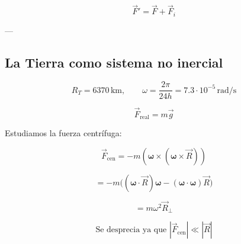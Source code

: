 \documentclass[a4paper,12pt]{article}
\begin{document}
\[
\vec{F}' = \vec{F} + \vec{F}_i
\]

---

\subsection{La Tierra como sistema no inercial}

\[
R_T = 6370\, \text{km}, 
\qquad 
\omega = \frac{2\pi}{24h} = 7.3\cdot 10^{-5}\,\text{rad/s}
\]

\[
\vec{F}_{\text{real}} = m\vec{g}
\]

Estudiamos la fuerza centrífuga:

\[
\vec{F}_{\text{cen}} = -m(\boldsymbol{\omega}\times (\boldsymbol{\omega}\times \vec{R}))
\]

\[
= -m\big((\boldsymbol{\omega}\cdot \vec{R})\boldsymbol{\omega} - (\boldsymbol{\omega}\cdot \boldsymbol{\omega})\vec{R}\big)
\]

\[
= m\omega^2 \vec{R}_\perp
\]

\[
\text{Se desprecia ya que } |\vec{F}_{\text{cen}}|\ll |\vec{R}|
\]
\end{document}
